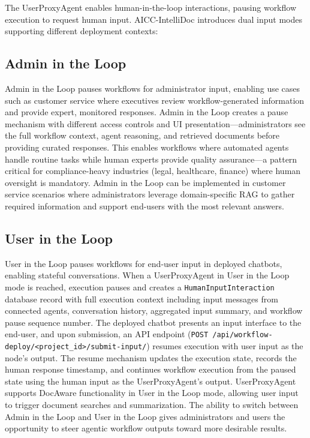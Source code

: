 \documentclass[11pt]{article}
\begin{document}
The UserProxyAgent enables human-in-the-loop interactions, pausing workflow execution to request human input. AICC-IntelliDoc introduces dual input modes supporting different deployment contexts:

\subsection{Admin in the Loop}

Admin in the Loop pauses workflows for administrator input, enabling use cases such as customer service where executives review workflow-generated information and provide expert, monitored responses. Admin in the Loop creates a pause mechanism with different access controls and UI presentation—administrators see the full workflow context, agent reasoning, and retrieved documents before providing curated responses. This enables workflows where automated agents handle routine tasks while human experts provide quality assurance—a pattern critical for compliance-heavy industries (legal, healthcare, finance) where human oversight is mandatory. Admin in the Loop can be implemented in customer service scenarios where administrators leverage domain-specific RAG to gather required information and support end-users with the most relevant answers.

\subsection{User in the Loop}

User in the Loop pauses workflows for end-user input in deployed chatbots, enabling stateful conversations. When a UserProxyAgent in User in the Loop mode is reached, execution pauses and creates a \texttt{HumanInputInteraction} database record with full execution context including input messages from connected agents, conversation history, aggregated input summary, and workflow pause sequence number. The deployed chatbot presents an input interface to the end-user, and upon submission, an API endpoint (\texttt{POST /api/workflow-deploy/<project\_id>/submit-input/}) resumes execution with user input as the node's output. The resume mechanism updates the execution state, records the human response timestamp, and continues workflow execution from the paused state using the human input as the UserProxyAgent's output. UserProxyAgent supports DocAware functionality in User in the Loop mode, allowing user input to trigger document searches and summarization. The ability to switch between Admin in the Loop and User in the Loop gives administrators and users the opportunity to steer agentic workflow outputs toward more desirable results.
\end{document}
